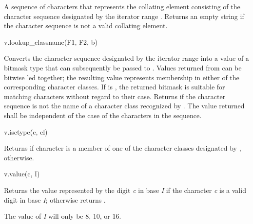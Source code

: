 \begin{itemdescr}
\pnum
\result
{}

\pnum
\returns
A sequence of characters that represents the collating element
consisting of the character sequence designated by
the iterator range .
Returns an empty string
if the character sequence is not a valid collating element.
\end{itemdescr}

\begin{itemdecl}
v.lookup_classname(F1, F2, b)
\end{itemdecl}

\begin{itemdescr}
\pnum
\result
{}

\pnum
\returns
Converts the character sequence designated by the iterator range
 into a value of a bitmask type that can
subsequently be passed to .
Values returned from  can be bitwise 'ed together;
the resulting value represents membership
in either of the corresponding character classes.
If  is , the returned bitmask is suitable for
matching characters without regard to their case.
Returns 
if the character sequence is not the name of
a character class recognized by  .
The value returned shall be independent of
the case of the characters in the sequence.
\end{itemdescr}

\begin{itemdecl}
v.isctype(c, cl)
\end{itemdecl}

\begin{itemdescr}
\pnum
\result
{}

\pnum
\returns
Returns  if character  is a member of
one of the character classes designated by ,
 otherwise.
\end{itemdescr}

\begin{itemdecl}
v.value(c, I)
\end{itemdecl}

\begin{itemdescr}
\pnum
\result
{}

\pnum
\returns
Returns the value represented by the digit \textit{c} in base
\textit{I} if the character \textit{c} is a valid digit in base \textit{I};
otherwise returns .
\begin{note}
The value of \textit{I} will only be 8, 10, or 16.
\end{note}
\end{itemdescr}

